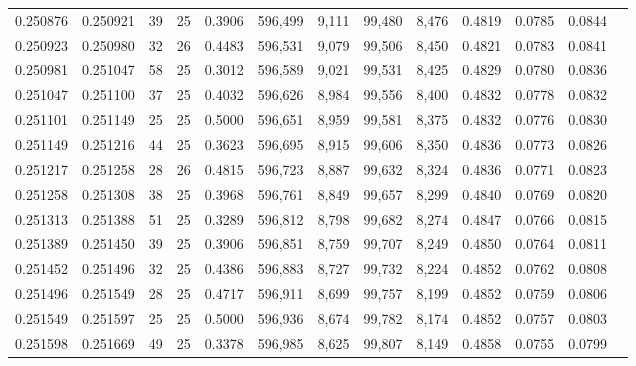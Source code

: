 \begin{tabular}{rrrrrrrrrrrrr}
0.250876 & 0.250921 &    39 &  25 &                                     0.3906 & 596,499 &   9,111 &  99,480 &   8,476 & 0.4819 & 0.0785 & 0.0844 \\
0.250923 & 0.250980 &    32 &  26 &                                     0.4483 & 596,531 &   9,079 &  99,506 &   8,450 & 0.4821 & 0.0783 & 0.0841 \\
0.250981 & 0.251047 &    58 &  25 &                                     0.3012 & 596,589 &   9,021 &  99,531 &   8,425 & 0.4829 & 0.0780 & 0.0836 \\
0.251047 & 0.251100 &    37 &  25 &                                     0.4032 & 596,626 &   8,984 &  99,556 &   8,400 & 0.4832 & 0.0778 & 0.0832 \\
0.251101 & 0.251149 &    25 &  25 &                                     0.5000 & 596,651 &   8,959 &  99,581 &   8,375 & 0.4832 & 0.0776 & 0.0830 \\
0.251149 & 0.251216 &    44 &  25 &                                     0.3623 & 596,695 &   8,915 &  99,606 &   8,350 & 0.4836 & 0.0773 & 0.0826 \\
0.251217 & 0.251258 &    28 &  26 &                                     0.4815 & 596,723 &   8,887 &  99,632 &   8,324 & 0.4836 & 0.0771 & 0.0823 \\
0.251258 & 0.251308 &    38 &  25 &                                     0.3968 & 596,761 &   8,849 &  99,657 &   8,299 & 0.4840 & 0.0769 & 0.0820 \\
0.251313 & 0.251388 &    51 &  25 &                                     0.3289 & 596,812 &   8,798 &  99,682 &   8,274 & 0.4847 & 0.0766 & 0.0815 \\
0.251389 & 0.251450 &    39 &  25 &                                     0.3906 & 596,851 &   8,759 &  99,707 &   8,249 & 0.4850 & 0.0764 & 0.0811 \\
0.251452 & 0.251496 &    32 &  25 &                                     0.4386 & 596,883 &   8,727 &  99,732 &   8,224 & 0.4852 & 0.0762 & 0.0808 \\
0.251496 & 0.251549 &    28 &  25 &                                     0.4717 & 596,911 &   8,699 &  99,757 &   8,199 & 0.4852 & 0.0759 & 0.0806 \\
0.251549 & 0.251597 &    25 &  25 &                                     0.5000 & 596,936 &   8,674 &  99,782 &   8,174 & 0.4852 & 0.0757 & 0.0803 \\
0.251598 & 0.251669 &    49 &  25 &                                     0.3378 & 596,985 &   8,625 &  99,807 &   8,149 & 0.4858 & 0.0755 & 0.0799 \\

\end{tabular}

